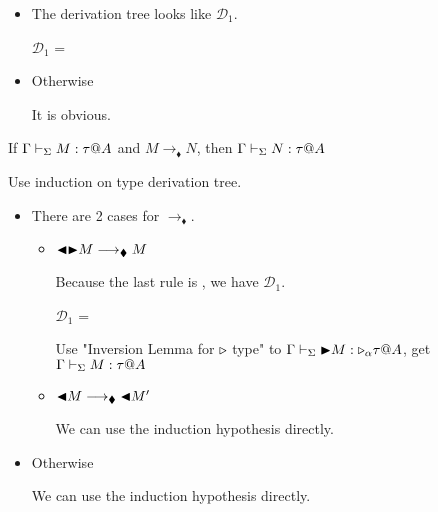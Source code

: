 \begin{itemize}
	\item \TTB
	      	      	      
	      The derivation tree looks like $\mathcal{D}_1$.
	      	      	      
	      $\mathcal{D}_1$ = 
	      {}
	      	      	      
	\item Otherwise
	      	      	      
	      It is obvious.
	      	      	      
\end{itemize}

\begin{theorem}
	If $\G\V M:\tau@A$ and $M\longrightarrow_\blacklozenge N$, then $\G\V N:\tau@A$\\
\end{theorem}

Use induction on type derivation tree.

\begin{itemize}
	\newcommand{\R}{\longrightarrow_{\blacklozenge}}
		
	\item \TTBL
	      	      
	      There are 2 cases for $\R$.
	      	      
	      \begin{itemize}
	      	\item $\TBL\TB M \R M$
	      	      	      	      
	      	      Because the last rule is \TTBL, we have $\mathcal{D}_1$.
	      	      	      	      
	      	      $\mathcal{D}_1$ = 
	      	      {}
	      	      	      	      
	      	      Use "Inversion Lemma for ${\mathop{\triangleright}}$ type" to $\Gamma \vdash_\Sigma {\mathop{\blacktriangleright}} M : {\mathop{\triangleright}}_\alpha \tau @A$,  get $\Gamma \vdash_\Sigma M : \tau @A$
	      	      	      	      
	      	\item $\TBL M \R \TBL M'$
	      	      	      	      
	      	      We can use the induction hypothesis directly.
	      \end{itemize}
	      	      
	\item Otherwise
	      	      
	      We can use the induction hypothesis directly.
\end{itemize}

